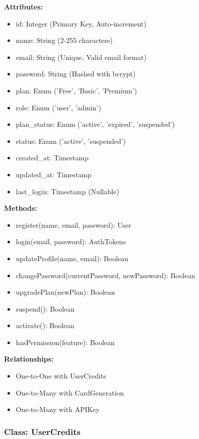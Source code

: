 \documentclass[12pt,a4paper]{article}
\begin{document}
\textbf{Attributes:}
\begin{itemize}
    \item id: Integer (Primary Key, Auto-increment)
    \item name: String (2-255 characters)
    \item email: String (Unique, Valid email format)
    \item password: String (Hashed with bcrypt)
    \item plan: Enum ('Free', 'Basic', 'Premium')
    \item role: Enum ('user', 'admin')
    \item plan\_status: Enum ('active', 'expired', 'suspended')
    \item status: Enum ('active', 'suspended')
    \item created\_at: Timestamp
    \item updated\_at: Timestamp
    \item last\_login: Timestamp (Nullable)
\end{itemize}

\textbf{Methods:}
\begin{itemize}
    \item register(name, email, password): User
    \item login(email, password): AuthTokens
    \item updateProfile(name, email): Boolean
    \item changePassword(currentPassword, newPassword): Boolean
    \item upgradePlan(newPlan): Boolean
    \item suspend(): Boolean
    \item activate(): Boolean
    \item hasPermission(feature): Boolean
\end{itemize}

\textbf{Relationships:}
\begin{itemize}
    \item One-to-One with UserCredits
    \item One-to-Many with CardGeneration
    \item One-to-Many with APIKey
\end{itemize}

\subsubsection{Class: UserCredits}
\end{document}
